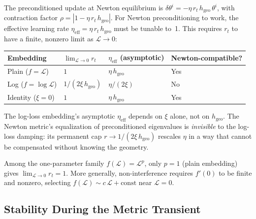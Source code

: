 \documentclass{article}
\newcommand{\loss}{\mathcal{L}}
\begin{document}
The preconditioned update at Newton equilibrium is
$\delta\theta^i = -\eta\,r_t\,h_\mathrm{geo}\,\theta^i$,
with contraction factor $\rho = |1 - \eta\,r_t\,h_\mathrm{geo}|$.
For Newton preconditioning to work, the effective learning rate
$\eta_\mathrm{eff} = \eta\,r_t\,h_\mathrm{geo}$
must be tunable to~1.
This requires $r_t$ to have a finite, nonzero limit as $\loss\to 0$:
\begin{center}
\small
\begin{tabular}{@{}llll@{}}
    \toprule
    \textbf{Embedding} & $\lim_{\loss\to 0} r_t$ & $\eta_\mathrm{eff}$ (asymptotic) & \textbf{Newton-compatible?} \\
    \midrule
    Plain ($f=\loss$)         & $1$                        & $\eta\,h_\mathrm{geo}$ & Yes \\
    Log ($f=\log\loss$)       & $1/(2\xi\,h_\mathrm{geo})$ & $\eta/(2\xi)$          & No \\
    Identity ($\xi=0$)        & $1$                        & $\eta\,h_\mathrm{geo}$ & Yes \\
    \bottomrule
\end{tabular}
\end{center}

\noindent
The log-loss embedding's asymptotic $\eta_\mathrm{eff}$ depends on $\xi$ alone,
not on $h_\mathrm{geo}$.
The Newton metric's equalization of preconditioned eigenvalues is
\emph{invisible} to the log-loss damping:
its permanent cap $r\to 1/(2\xi\,h_\mathrm{geo})$
rescales $\eta$ in a way that cannot be compensated without knowing the geometry.

\begin{tcolorbox}[colback=blue!4, colframe=blue!25, breakable,
  title=\textbf{Non-Interference Theorem},
  coltitle=black]
Among the one-parameter family $f(\loss) = \loss^p$, only $p=1$
(plain embedding) gives $\lim_{\loss\to 0} r_t = 1$.
More generally, non-interference requires $f'(0)$ to be finite and nonzero,
selecting $f(\loss) \sim c\,\loss + \mathrm{const}$ near $\loss=0$.
\end{tcolorbox}

\subsection{Stability During the Metric Transient}\label{sec:embed-transient}
\end{document}
